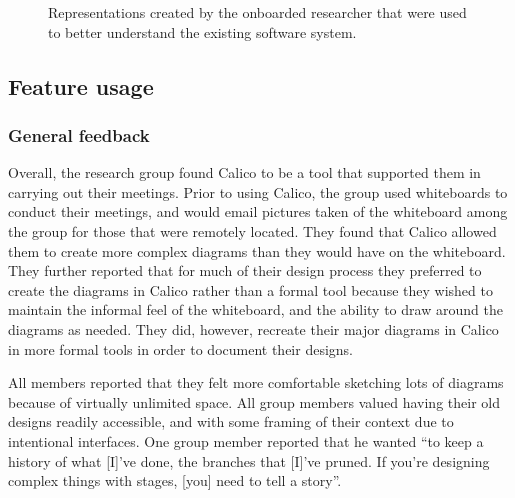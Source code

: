 \documentclass[12pt,fleqn]{ucithesis}
\begin{document}
\begin{figure}%
  \centering
   \caption {Representations created by the onboarded researcher that were used to better understand the existing software system.}
   \label{fig:researchgroup:2}   
\end{figure}%

\subsection{Feature usage}

\subsubsection{General feedback}

Overall, the research group found Calico to be a tool that supported them in carrying out their meetings. Prior to using Calico, the group used whiteboards to conduct their meetings, and would email pictures taken of the whiteboard among the group for those that were remotely located. They found that Calico allowed them to create more complex diagrams than they would have on the whiteboard. They further reported that for much of their design process they preferred to create the diagrams in Calico rather than a formal tool because they wished to maintain the informal feel of the whiteboard, and the ability to draw around the diagrams as needed. They did, however, recreate their major diagrams in Calico in more formal tools in order to document their designs.

All members reported that they felt more comfortable sketching lots of diagrams because of virtually unlimited space. All group members valued having their old designs readily accessible, and with some framing of their context due to intentional interfaces. One group member reported that he wanted ``to keep a history of what [I]'ve done, the branches that [I]'ve pruned. If you're designing complex things with stages, [you] need to tell a story''.
\end{document}
